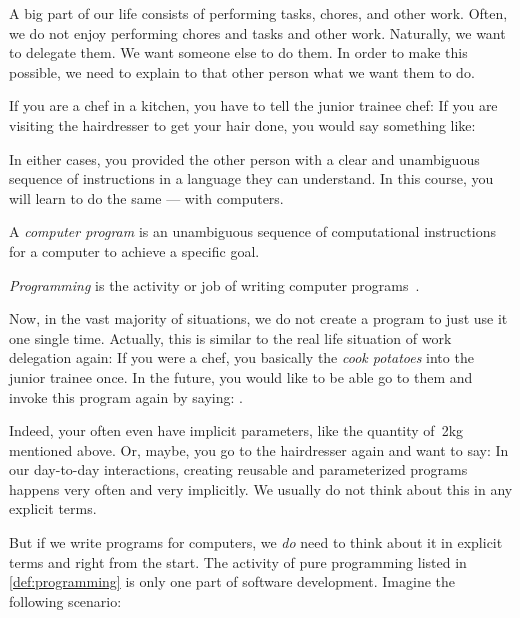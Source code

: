 %
A big part of our life consists of performing tasks, chores, and other work.
Often, we do not enjoy performing chores and tasks and other work.
Naturally, we want to delegate them.
We want someone else to do them.
In order to make this possible, we need to explain to that other person what we want them to do.

If you are a chef in a kitchen, you have to tell the junior trainee chef:
If you are visiting the hairdresser to get your hair done, you would say something like:

In either cases, you provided the other person with a clear and unambiguous sequence of instructions in a language they can understand.
In this course, you will learn to do the same --- with computers.
%
\begin{definition}%
A \emph{computer program} is an unambiguous sequence of computational instructions for a computer to achieve a specific goal.%
\end{definition}%
\begin{definition}[Programming]%
\label{def:programming}
\emph{Programming} is the activity or job of writing computer programs~\cite{CDE2024PMOPIE}.%
\end{definition}%
%
Now, in the vast majority of situations, we do not create a program to just use it one single time.
Actually, this is similar to the real life situation of work delegation again:
If you were a chef, you basically  the  \emph{cook potatoes} into the junior trainee once.
In the future, you would like to be able go to them and invoke this program again by saying:
.

Indeed, your  often even have implicit parameters, like the quantity of~2kg mentioned above.
Or, maybe, you go to the hairdresser again and want to say: 
In our day-to-day interactions, creating reusable and parameterized programs happens very often and very implicitly.
We usually do not think about this in any explicit terms.

But if we write programs for computers, we \emph{do} need to think about it in explicit terms and right from the start.
The activity of pure programming listed in \cref{def:programming} is only one part of software development.
Imagine the following scenario:

